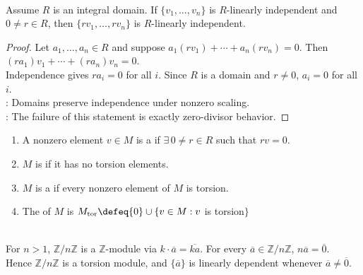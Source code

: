 \begin{proposition} \label{prop:integral-domain-scaling-preserves-independence} \\
Assume $R$ is an integral domain. If $\{v_1,\ldots,v_n\}$ is $R$-linearly independent and $0\neq r\in R$, then $\{rv_1,\ldots,rv_n\}$ is $R$-linearly independent.
\begin{proof}
Let $a_1,\ldots,a_n\in R$ and suppose $a_1(rv_1)+\cdots+a_n(rv_n)=0$. Then $(ra_1)v_1+\cdots+(ra_n)v_n=0$.\\
Independence gives $ra_i=0$ for all $i$. Since $R$ is a domain and $r\neq0$, $a_i=0$ for all $i$.\\
: Domains preserve independence under nonzero scaling.\\
: The failure of this statement is exactly zero-divisor behavior.
\end{proof}
\end{proposition}

\begin{definition} \label{def:module-torsion} 
\begin{enumerate}[label=(\roman*)]
\setlength{\itemsep}{0pt}
\item A nonzero element $v\in M$ is a  if $\exists\,0\neq r\in R$ such that $rv=0$.
\item $M$ is  if it has no torsion elements.
\item $M$ is a  if every nonzero element of $M$ is torsion.
\item The  of $M$ is $M_{\operatorname{tor}}\defeq\{0\}\cup\{v\in M:v$ is torsion$\}$
\end{enumerate}
\end{definition}

\begin{example} \label{ex:zn-is-torsion-module} \\
For $n>1$, $\mathbb{Z}/n\mathbb{Z}$ is a $\mathbb{Z}$-module via $k\cdot \overline{a}=\overline{ka}$. For every $\overline{a}\in\mathbb{Z}/n\mathbb{Z}$, $n\overline{a}=\overline{0}$.\\
Hence $\mathbb{Z}/n\mathbb{Z}$ is a torsion module, and $\{\overline{a}\}$ is linearly dependent whenever $\overline{a}\neq\overline{0}$.
\end{example}

